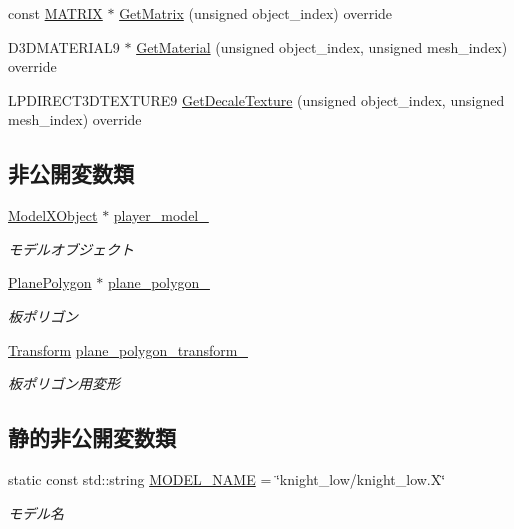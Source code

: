 \begin{DoxyCompactItemize}
\item 
const \mbox{\hyperlink{_vector3_d_8h_a032295cd9fb1b711757c90667278e744}{M\+A\+T\+R\+IX}} $\ast$ \mbox{\hyperlink{class_stencil_shadow_test_draw_adfa99798c61ac13f209dc99f1e2694c5}{Get\+Matrix}} (unsigned object\+\_\+index) override
\item 
D3\+D\+M\+A\+T\+E\+R\+I\+A\+L9 $\ast$ \mbox{\hyperlink{class_stencil_shadow_test_draw_abfc9caaaa1b6120e2013701a9d264f2d}{Get\+Material}} (unsigned object\+\_\+index, unsigned mesh\+\_\+index) override
\item 
L\+P\+D\+I\+R\+E\+C\+T3\+D\+T\+E\+X\+T\+U\+R\+E9 \mbox{\hyperlink{class_stencil_shadow_test_draw_a387a97781f743aa0ea0727c050ef53b2}{Get\+Decale\+Texture}} (unsigned object\+\_\+index, unsigned mesh\+\_\+index) override
\end{DoxyCompactItemize}
\subsection*{非公開変数類}
\begin{DoxyCompactItemize}
\item 
\mbox{\hyperlink{class_model_x_object}{Model\+X\+Object}} $\ast$ \mbox{\hyperlink{class_stencil_shadow_test_draw_a6c57baf28efdf89dbfb52fb379f33c26}{player\+\_\+model\+\_\+}}
\begin{DoxyCompactList}\small\item\em モデルオブジェクト \end{DoxyCompactList}\item 
\mbox{\hyperlink{class_plane_polygon}{Plane\+Polygon}} $\ast$ \mbox{\hyperlink{class_stencil_shadow_test_draw_ae2abfaec1e669ea0019e67d02e2942b6}{plane\+\_\+polygon\+\_\+}}
\begin{DoxyCompactList}\small\item\em 板ポリゴン \end{DoxyCompactList}\item 
\mbox{\hyperlink{class_transform}{Transform}} \mbox{\hyperlink{class_stencil_shadow_test_draw_ae64a0179736364fd9e6d26074edcf61a}{plane\+\_\+polygon\+\_\+transform\+\_\+}}
\begin{DoxyCompactList}\small\item\em 板ポリゴン用変形 \end{DoxyCompactList}\end{DoxyCompactItemize}
\subsection*{静的非公開変数類}
\begin{DoxyCompactItemize}
\item 
static const std\+::string \mbox{\hyperlink{class_stencil_shadow_test_draw_a1ef49214f41a9fa1f3c2a7616eaf5655}{M\+O\+D\+E\+L\+\_\+\+N\+A\+ME}} = \char`\"{}knight\+\_\+low/knight\+\_\+low.\+X\char`\"{}
\begin{DoxyCompactList}\small\item\em モデル名 \end{DoxyCompactList}\end{DoxyCompactItemize}



